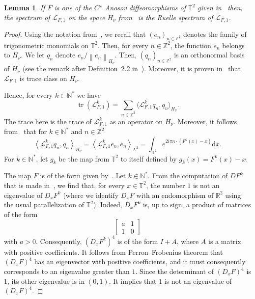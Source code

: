 \documentclass[10pt]{amsart}
\newtheorem{lemm}[theo]{Lemma}\newtheorem{prop}[theo]{Proposition}\newtheorem{coro}[theo]{Corollary}\newtheorem{conj}[theo]{Conjecture}
\theoremstyle{definition}\newtheorem{defi}[theo]{Definition}\newtheorem{rema}[theo]{Remark}\newtheorem{exam}[theo]{Example}\newtheorem{exem}[theo]{Example}\newtheorem{nota}[theo]{Notation}
\DeclareMathOperator{\tr}{tr}
\newcommand{\p}[1]{\left(#1\right)}
\newcommand{\n}[1]{\left\|#1\right\|}
\newcommand{\brac}[1]{\langle #1 \rangle}
\newcommand{\clL}{\mathcal{L}}
\newcommand{\bbZ}{\mathbb{Z}}
\newcommand{\bbT}{\mathbb{T}}
\newcommand{\bbN}{\mathbb{N}}
\newcommand{\bbR}{\mathbb{R}}
\newcommand{\rmd}{\mathrm{d}}
\newcommand*{\MK}{\mkern 2mu}
\begin{document}
\begin{lemm}\label{lemma:lesmemes}
If $F$ is one of the $C^\omega$ Anosov diffeomorphisms of $\bbT^2$ given in~\cite[Theorem~1.3$\MK$(i)]{optimal_examples} then, the spectrum of $\clL_{F,1}$ on the space $H_\nu$ from~\cite[Theorem~1.3]{optimal_examples} is the Ruelle spectrum of $\clL_{F,1}$.
\end{lemm}

\begin{proof}
Using the notation from~\cite{optimal_examples}, we recall that $(e_n)_{n \in \bbZ^2}$ denotes the family of trigonometric monomials on $\bbT^2$. Then, for every $n \in \bbZ^2$, the function $e_n$ belongs to $H_\nu$. We let $q_n$ denote $e_n / \n{e_n}_{H_\nu}$. Then, $(q_n)_{n \in \bbZ^2}$ is an orthonormal basis of $H_\nu$ (see the remark after Definition~2.2 in~\cite{optimal_examples}). Moreover, it is proven in~\cite{optimal_examples} that $\clL_{F,1}$ is trace class on $H_\nu$.

Hence, for every $k \in \bbN^*$ we have
\begin{equation*}
\tr \p{\clL_{F,1}^k} = \sum_{n \in \bbZ^2} \brac{\clL_{F,1}^k q_n, q_n }_{H_\nu}.
\end{equation*}
The trace here is the trace of $\clL_{F,1}^k$ as an operator on $H_\nu$. Moreover, it follows from~\cite[Remark~4.7]{optimal_examples} that for $k \in \bbN^*$ and $n \in \bbZ^2$
\begin{equation*}
\left\langle\clL_{F,1}^k q_n, q_n\right\rangle_{H_\nu} = \left\langle\clL_{F,1}^k e_n, e_n\right\rangle_{L^2} = \int_{\bbT^2} e^{2 i \pi n \cdot \left(F^k(x) - x\right)} \rmd x.
\end{equation*}
For $k \in \bbN^*$, let $g_k$ be the map from $\bbT^2$ to itself defined by $g_k(x) = F^k(x) -x$.

The map $F$ is of the form given by~\cite[(19)]{optimal_examples}. Let $k \in \bbN^*$. From the computation of $D F^k$ that is made in~\cite[Proposition~5.5]{optimal_examples}, we find that, for every $x \in \bbT^2$, the number $1$ is not an eigenvalue of $D_xF^k$ (where we identify $D_xF$ with an endomorphism of $\bbR^2$ using the usual parallelization of $\bbT^2$). Indeed, $D_x F^k$ is, up to sign, a product of matrices of the form
\begin{equation*}
\left[
\begin{array}{cc}
a & 1 \\ 1 & 0
\end{array}\right]
\end{equation*}
with $a > 0$. Consequently, $(D_x F^k)^4$ is of the form $I + A$, where $A$ is a matrix with positive coefficients. It follows from Perron--Frobenius theorem that $(D_x F)^4$ has an eigenvector with positive coefficients, and it must consequently corresponds to an eigenvalue greater than $1$. Since the determinant of $(D_x F)^4$ is $1$, its other eigenvalue is in $(0,1)$. It implies that $1$ is not an eigenvalue of $(D_x F)^4$.


\end{proof}
\end{document}
